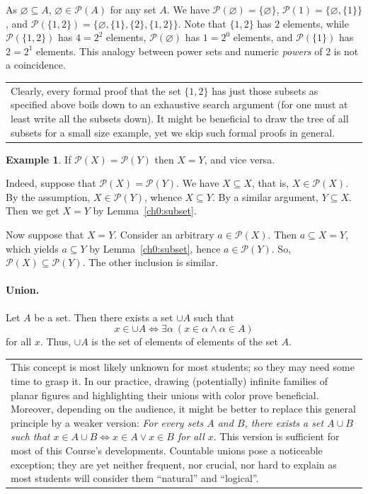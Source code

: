 \documentclass[12pt,notitlepage]{article}
\theoremstyle{plain}
\theoremstyle{definition}
\newtheorem{exm}[thm]{Example}
\theoremstyle{plain}
\newcommand{\sbs}{\subseteq}
\newcommand{\void}{\varnothing}
\newcommand{\mP}{\mathcal{P}}
\newcommand{\1}{\mathbf{1}}
\newcommand{\0}{\mathbf{0}}
\newcommand{\mcomm}[1]{
\medskip\noindent\begin{tabular}{| l}
\parbox{0.99\textwidth}{{\small
#1 }}\end{tabular}
\smallskip}
\begin{document}
As $\void \sbs A$, $\void \in \mP(A)$ for any set $A$. We have $\mP(\void) = \{\void\}$, $\mP(1) = \{\void, \{1\} \}$, and $\mP(\{1,2\}) = \{\void, \{1\}, \{2\}, \{1,2\}\}$. Note that $\{1,2\}$ has $2$ elements, while $\mP(\{1,2\})$ has $4 = 2^2$ elements, $\mP(\void)$ has $1 = 2^0$ elements, and $\mP(\{1\})$ has $2 = 2^1$ elements. This analogy between power sets and numeric \emph{powers} of $2$ is not a coincidence.

\mcomm{Clearly, every formal proof that the set $\{1,2\}$ has just those subsets as specified above boils down to an exhaustive search argument (for one must at least write all the subsets down). It might be beneficial to draw the tree of all subsets for a small size example, yet we skip such formal proofs in general.}

\begin{exm}
If $\mP(X) = \mP(Y)$ then $X  = Y$, and vice versa.

Indeed, suppose that $\mP(X) = \mP(Y)$. We have $X \sbs X$, that is, $X \in \mP(X)$. By the assumption, $X \in \mP(Y)$, whence $X \sbs Y$.  By a similar argument, $Y \sbs X$. Then we get $X = Y$ by Lemma~\ref{ch0:subset}.

Now suppose that $X = Y$. Consider an arbitrary $a \in \mP(X)$. Then $a \sbs X = Y$, which yields $a \sbs Y$ by Lemma~\ref{ch0:subset}, hence $a \in \mP(Y)$. So, $\mP(X) \sbs \mP(Y)$. The other inclusion is similar.
\end{exm}

\paragraph{Union.} Let $A$ be a set. Then there exists a set $\cup A$ such that
$$x \in \cup A \iff \exists \alpha\ (x \in \alpha \wedge \alpha \in A)$$
for all $x$. Thus, $\cup A$ is the set of elements of elements of the set $A$.

\mcomm{This concept is most likely unknown for most students; so they may need some time to grasp it. In our practice, drawing (potentially) infinite families of planar figures and highlighting their unions with color prove beneficial.
\medskip\\
Moreover, depending on the audience, it might be better to replace this general principle by a weaker version:
\emph{For every sets $A$ and $B$, there exists a set $A \cup B$ such that
$x \in A \cup B \iff x \in A \vee x \in B$ for all $x$}. This version is sufficient for most of this Course's developments. Countable unions pose a noticeable exception; they are yet neither frequent, nor crucial, nor hard to explain as most students will consider them ``natural'' and ``logical''.}
\end{document}
